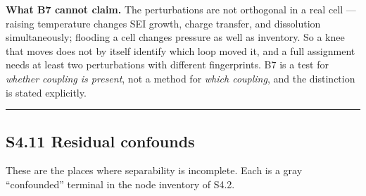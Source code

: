 \documentclass[11pt,a4paper]{article}
\begin{document}
\textbf{What B7 cannot claim.} The perturbations are not orthogonal in a real cell --- raising temperature changes SEI growth, charge transfer, and dissolution simultaneously; flooding a cell changes pressure as well as inventory. So a knee that moves does not by itself identify which loop moved it, and a full assignment needs at least two perturbations with different fingerprints. B7 is a test for \emph{whether coupling is present}, not a method for \emph{which coupling}, and the distinction is stated explicitly.


\par\noindent\rule{\linewidth}{0.4pt}\par


\subsection*{S4.11 Residual confounds}


These are the places where separability is incomplete. Each is a gray \textquotedblleft{}confounded\textquotedblright{} terminal in the node inventory of S4.2.
\end{document}
